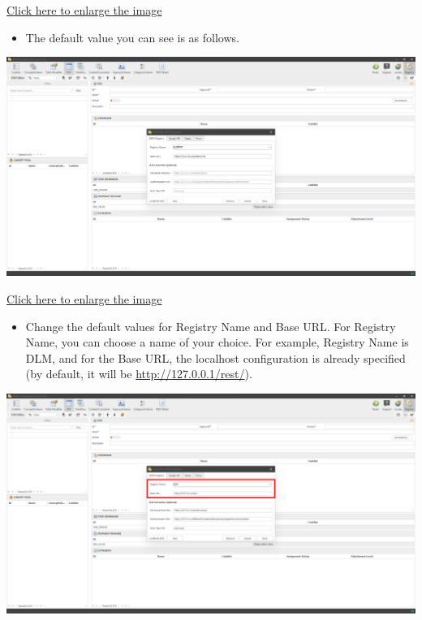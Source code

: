 \documentclass[
]{book}
\providecommand{\tightlist}{%
  \setlength{\itemsep}{0pt}\setlength{\parskip}{0pt}}
\begin{document}
\href{images/image208.png}{Click here to enlarge the image}

\begin{itemize}
\tightlist
\item
  The default value you can see is as follows.
\end{itemize}

\begin{center}\includegraphics[width=1\linewidth]{./images/image210} \end{center}

\href{images/image210.png}{Click here to enlarge the image}

\begin{itemize}
\tightlist
\item
  Change the default values for Registry Name and Base URL. For Registry Name, you can choose a name of your choice. For example, Registry Name is DLM, and for the Base URL, the localhost configuration is already specified (by default, it will be \url{http://127.0.0.1/rest/}).
\end{itemize}

\begin{center}\includegraphics[width=1\linewidth]{./images/image212} \end{center}
\end{document}
